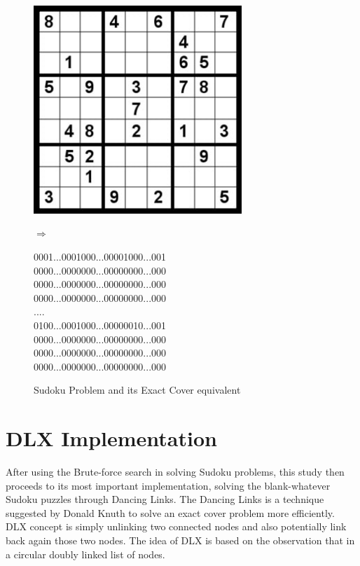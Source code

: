\documentclass[a4paper,oneside,11pt]{report}
\begin{document}
\begin{figure}[h]
\begin{minipage}{0.5\textwidth}
{\includegraphics[width=0.7\textwidth]{sampleduko.jpg}}
\newline
\end{minipage}
\hspace*{-1cm}$\Rightarrow$\hspace{1cm}
\begin{minipage}{0.5\textwidth}
0001...0001000...00001000...001\\
0000...0000000...00000000...000\\
0000...0000000...00000000...000\\
0000...0000000...00000000...000\\
....\\
0100...0001000...00000010...001\\
0000...0000000...00000000...000\\
0000...0000000...00000000...000\\
0000...0000000...00000000...000\\
\end{minipage}
\caption{Sudoku Problem and its Exact Cover equivalent}
\end{figure}

\newpage
\section{DLX Implementation}
After using the Brute-force search in solving Sudoku problems, this study then proceeds to its most important implementation, solving the blank-whatever Sudoku puzzles through Dancing Links. The Dancing Links is a technique suggested by Donald Knuth to solve an exact cover problem more efficiently. DLX concept is simply unlinking two connected nodes and also potentially link back again those two nodes. The idea of DLX is based on the observation that in a circular doubly linked list of nodes.
\end{document}
